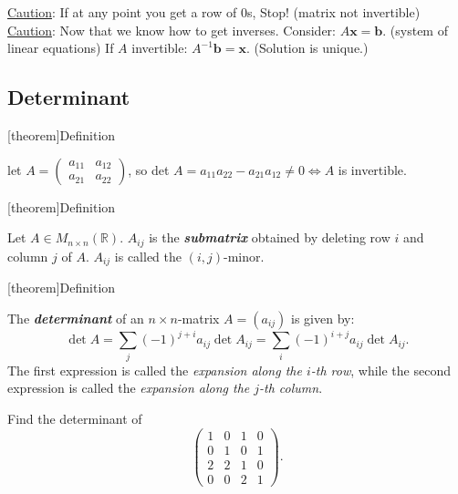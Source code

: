 \documentclass[12pt]{report}
\theoremstyle{definition}
\begin{document}
\underline{Caution}: If at any point you get a row of 0s, Stop! (matrix not invertible)
\underline{Caution}: Now that we know how to get inverses. Consider:
$A\pmb{x} = \pmb{b}$. (system of linear equations)
If $A$ invertible: $A^{-1}\pmb{b} = \pmb{x}$. (Solution is unique.)

\subsection{Determinant}

[theorem]{Definition}
\begin{determinant}
    let $A = \begin{pmatrix}
        a_{11} & a_{12} \\
        a_{21} & a_{22}
    \end{pmatrix} $,
    so det $A = a_{11}a_{22} - a_{21}a_{12}\neq 0 \iff A$ is invertible.
\end{determinant}

[theorem]{Definition}
\begin{submatrix}
    Let $A \in M_{n\times n} (\mathbb{R})$. $A_{ij}$ is the \textbf{\emph{submatrix}} obtained
    by deleting row $i$ and column $j$ of $A$. $A_{ij}$ is called the $(i,j)$-minor.
\end{submatrix}

[theorem]{Definition}
\begin{determinant of nxn matrix}
    The \textbf{\emph{determinant}} of an $n\times n$-matrix $A = (a_{ij})$ is given by:\[
        \det{A} = \sum_{j}^{} {(-1)}^{j + i} a_{ij} \det{A_{ij}}
        = \sum_{i}^{} {(-1)}^{i + j} a_{ij} \det{A_{ij}}.
    \]
    The first expression is called the \emph{expansion along the $i$-th row},
    while the second expression is called the \emph{expansion along the $j$-th column}.
\end{determinant of nxn matrix}

\begin{ex}
    Find the determinant of\[
        \begin{pmatrix}
            1 & 0 & 1 & 0 \\
            0 & 1 & 0 & 1 \\
            2 & 2 & 1 & 0 \\
            0 & 0 & 2 & 1
        \end{pmatrix}.
    \]
\end{ex}
\end{document}
